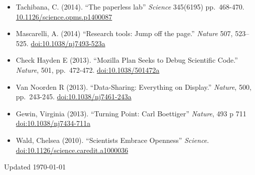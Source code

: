 \documentclass[10pt,sans]{moderncv}        %
\providecommand{\tightlist}{%
    \setlength{\itemsep}{0pt}\setlength{\parskip}{0pt}}
\begin{document}
\begin{itemize}
\tightlist
\item
  Tachibana, C. (2014). ``The paperless lab'' \emph{Science} 345(6195)
  pp.~468-470.
  \href{http://www.sciencemag.org/site/products/lst_20140613.xhtml}{10.1126/science.opms.p1400087}
\item
  Mascarelli, A. (2014) ``Research tools: Jump off the page.''
  \emph{Nature} 507, 523--525.
  \href{http://dx.doi.org/10.1038/nj7493-523a}{doi:10.1038/nj7493-523a}
\item
  Check Hayden E (2013). ``Mozilla Plan Seeks to Debug Scientific
  Code.'' \emph{Nature}, 501, pp.~472-472.
  \href{http://dx.doi.org/10.1038/501472a}{doi:10.1038/501472a}
\item
  Van Noorden R (2013). ``Data-Sharing: Everything on Display.''
  \emph{Nature}, 500, pp.~243-245.
  \href{http://dx.doi.org/10.1038/nj7461-243a}{doi:10.1038/nj7461-243a}
\item
  Gewin, Virginia (2013). ``Turning Point: Carl Boettiger''
  \emph{Nature}, 493 p 711
  \href{http://dx.doi.org/10.1038/nj7434-711a}{doi:10.1038/nj7434-711a}
\item
  Wald, Chelsea (2010). ``Scientists Embrace Openness'' \emph{Science}.
  \href{http://dx.doi.org/10.1126/science.caredit.a1000036}{doi:10.1126/science.caredit.a1000036}
\end{itemize}

\vfill
Updated \today
\end{document}
